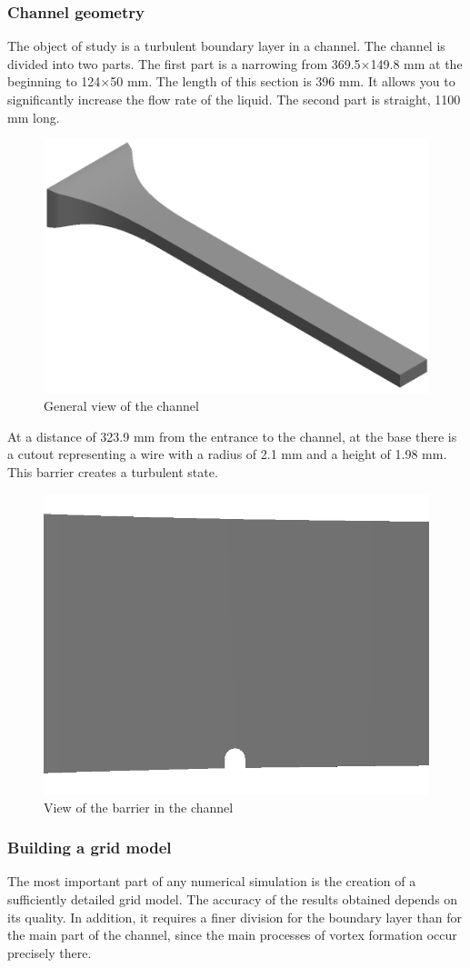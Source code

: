 \subsubsection{Channel geometry}
	The object of study is a turbulent boundary layer in a channel. The channel is divided into two parts. The first part is a narrowing from 369.5$\times$149.8 mm at the beginning to 124$\times$50 mm. The length of this section is 396 mm. It allows you to significantly increase the flow rate of the liquid. The second part is straight, 1100 mm long.
	\begin{figure}[H]
		\centering
		\includegraphics[width=0.7\linewidth]{../Assets/ВидКанала1}
		\caption{\footnotesize{General view of the channel}}
		\label{fig:channelview}
	\end{figure}
	At a distance of 323.9 mm from the entrance to the channel, at the base there is a cutout representing a wire with a radius of 2.1 mm and a height of 1.98 mm. This barrier creates a turbulent state.
	\begin{figure}[H]
		\centering
		\includegraphics[width=0.5\linewidth]{../Assets/ВидКанала4}
		\caption{\footnotesize{View of the barrier in the channel}}
		\label{fig:vortexgeneratorview}
	\end{figure}
\subsubsection{Building a grid model}
	The most important part of any numerical simulation is the creation of a sufficiently detailed grid model. The accuracy of the results obtained depends on its quality. In addition, it requires a finer division for the boundary layer than for the main part of the channel, since the main processes of vortex formation occur precisely there.
	
